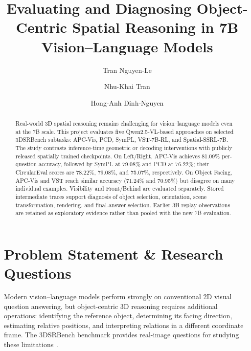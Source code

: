 \documentclass[runningheads]{llncs}
\begin{document}
\title{Evaluating and Diagnosing Object-Centric Spatial Reasoning in 7B Vision--Language Models}
\author{Tran Nguyen-Le \and Nhu-Khai Tran \and Hong-Anh Dinh-Nguyen}

\maketitle

\begin{abstract}
Real-world 3D spatial reasoning remains challenging for vision--language models even at the 7B scale. This project evaluates five Qwen2.5-VL-based approaches on selected 3DSRBench subtasks: APC-Vis, PCD, SymPL, VST-7B-RL, and Spatial-SSRL-7B. The study contrasts inference-time geometric or decoding interventions with publicly released spatially trained checkpoints. On Left/Right, APC-Vis achieves 81.09\% per-question accuracy, followed by SymPL at 79.08\% and PCD at 76.22\%; their CircularEval scores are 78.22\%, 79.08\%, and 75.07\%, respectively. On Object Facing, APC-Vis and VST reach similar accuracy (71.24\% and 70.95\%) but disagree on many individual examples. Visibility and Front/Behind are evaluated separately. Stored intermediate traces support diagnosis of object selection, orientation, scene transformation, rendering, and final-answer selection. Earlier 3B replay observations are retained as exploratory evidence rather than pooled with the new 7B evaluation.
\end{abstract}

\section{Problem Statement \& Research Questions}

Modern vision--language models perform strongly on conventional 2D visual question answering, but object-centric 3D reasoning requires additional operations: identifying the reference object, determining its facing direction, estimating relative positions, and interpreting relations in a different coordinate frame. The 3DSRBench benchmark provides real-image questions for studying these limitations~\cite{3dsrbench}.
\end{document}
